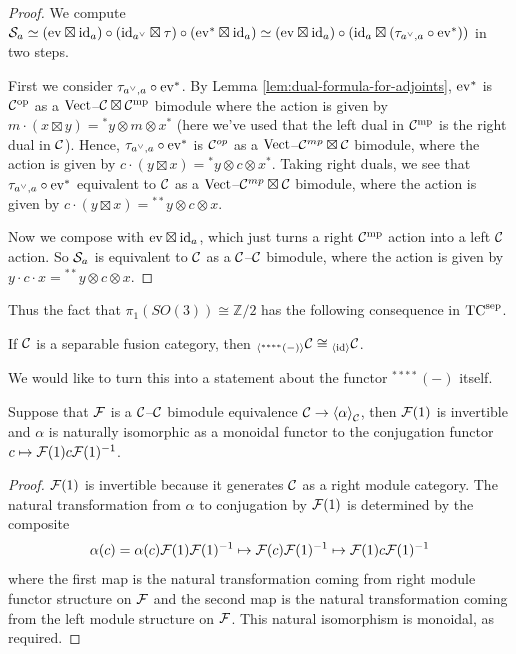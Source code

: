 \documentclass{amsart}
\begin{document}
\begin{proof}
We compute $\mathcal S_a \simeq (\mathrm{ev} \boxtimes \mathrm{id}_a) \circ (\mathrm{id}_{a^{\vee}} \boxtimes \tau) \circ (\mathrm{ev}^{*} \boxtimes \mathrm{id}_a) \simeq (\mathrm{ev} \boxtimes \mathrm{id}_a) \circ (\mathrm{id}_a \boxtimes (\tau_{a^\vee,a} \circ  \mathrm{ev}^*))$ in two steps.  

First we consider $\tau_{a^\vee,a} \circ  \mathrm{ev}^*$.  By Lemma \ref{lem:dual-formula-for-adjoints}, $\mathrm{ev}^*$ is $\mathcal C^{\mathrm{op}}$ as a $\mathrm{Vect}$--${\mathcal C \boxtimes \mathcal C^{\mathrm{mp}}}$ bimodule where the action is given by $m\cdot (x \boxtimes y) = {}^*y \otimes m \otimes x^*$ (here we've used that the left dual in $\mathcal C^{\mathrm{mp}}$ is the right dual in $\mathcal C$).  Hence, $\tau_{a^\vee,a} \circ  \mathrm{ev}^*$ is $\mathcal C^{op}$ as a $\mathrm{Vect}$--$\mathcal C^{mp} \boxtimes \mathcal C$ bimodule, where the action is given by $c \cdot (y \boxtimes x) =  {}^*y \otimes c \otimes x^*$.  Taking right duals, we see that $\tau_{a^\vee,a} \circ  \mathrm{ev}^*$ equivalent to $\mathcal C$ as a $\mathrm{Vect}$--$\mathcal C^{mp} \boxtimes \mathcal C$ bimodule, where the action is given by $c \cdot (y \boxtimes x) =  {}^{**}y \otimes c \otimes x$.

Now we compose with $\mathrm{ev} \boxtimes \mathrm{id}_a$, which just turns a right $\mathcal C^{\mathrm{mp}}$ action into a left $\mathcal C$ action.  So $\mathcal S_a$ is equivalent to $\mathcal C$ as a  $\mathcal C$--$\mathcal C$ bimodule, where the action is given by $y \cdot c \cdot x=  {}^{**}y \otimes c \otimes x$.
\end{proof}

Thus the fact that $\pi_1(SO(3)) \cong \mathbb{Z}/2$ has the following consequence in ${\mathrm{TC}^{\text{sep}}}$.

\begin{corollary}
If $\mathcal C$ is a separable fusion category, then ${}_{\langle{}^{****}(-)\rangle} \mathcal C \cong {}_{\langle\mathrm{id}\rangle} \mathcal C$.
\end{corollary}

We would like to turn this into a statement about the functor ${}^{****}(-)$ itself.

\begin{lemma}
Suppose that $\mathcal F$ is a $\mathcal C$--$\mathcal C$ bimodule equivalence $\mathcal C \rightarrow {\langle \alpha \rangle}_\mathcal C$, then $\mathcal F(1)$ is invertible and $\alpha$ is naturally isomorphic as a monoidal functor to the conjugation functor $c \mapsto \mathcal F(1) c \mathcal F(1)^{-1}$.  
\end{lemma}
\begin{proof}
$\mathcal F(1)$ is invertible because it generates $\mathcal C$ as a right module category.  The natural transformation from $\alpha$ to conjugation by $\mathcal F(1)$ is determined by the composite 
$$\alpha(c) = \alpha(c) \mathcal F(1) \mathcal F(1)^{-1} \mapsto \mathcal F(c) \mathcal F(1)^{-1} \mapsto \mathcal F(1) c \mathcal F(1)^{-1}$$
where the first map is the natural transformation coming from right module functor structure on $\mathcal F$ and the second map is the natural transformation coming from the left module structure on $\mathcal F$.  This natural isomorphism is monoidal, as required. 

\end{proof}
\end{document}
